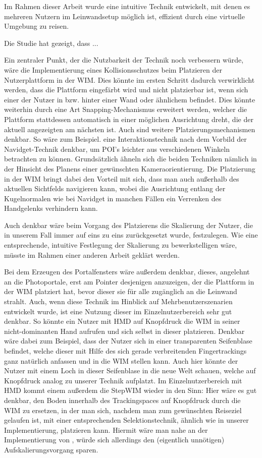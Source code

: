 Im Rahmen dieser Arbeit wurde eine intuitive Technik entwickelt, mit denen es mehreren Nutzern im Leinwandsetup möglich ist, effizient durch eine virtuelle Umgebung zu reisen. 

Die Studie hat gezeigt, dass ...


Ein zentraler Punkt, der die Nutzbarkeit der Technik noch verbessern würde, wäre die Implementierung eines Kollisionsschutzes beim Platzieren der Nutzerplattform in der WIM. Dies könnte im ersten Schritt dadurch verwirklicht werden, dass die Plattform eingefärbt wird und nicht platzierbar ist, wenn sich einer der Nutzer in bzw. hinter einer Wand oder ähnlichem befindet. Dies könnte weiterhin durch eine Art \glqq Snapping\grqq{}-Mechanismus erweitert werden, welcher die Plattform stattdessen automatisch in einer möglichen Ausrichtung dreht, die der aktuell angezeigten am nächsten ist.
Auch sind weitere Platzierungsmechanismen denkbar. So wäre zum Beispiel. eine Interaktionstechnik nach dem Vorbild der Navidget-Technik \cite{HACHET2009225} denkbar, um POI's leichter aus verschiedenen Winkeln betrachten zu können. Grundsätzlich ähneln sich die beiden Techniken nämlich in der Hinsicht des Planens einer gewünschten Kameraorientierung. Die Platzierung in der WIM bringt dabei den Vorteil mit sich, dass man auch außerhalb des aktuellen Sichtfelds navigieren kann, wobei die Ausrichtung entlang der Kugelnormalen wie bei Navidget in manchen Fällen ein Verrenken des Handgelenks verhindern kann.

Auch denkbar wäre beim Vorgang des Platzierens die Skalierung der Nutzer, die in unserem Fall immer auf eins zu eins zurückgesetzt wurde, festzulegen. Wie eine entsprechende, intuitive Festlegung der Skalierung zu bewerkstelligen wäre, müsste im Rahmen einer anderen Arbeit geklärt werden.

Bei dem Erzeugen des Portalfensters wäre außerdem denkbar, dieses, angelehnt an die Photoportale, erst am Pointer desjenigen anzuzeigen, der die Plattform in der WIM platziert hat, bevor dieser sie für alle zugänglich an die Leinwand strahlt.
Auch, wenn diese Technik im Hinblick auf Mehrbenutzerszenarien entwickelt wurde, ist eine Nutzung dieser im Einzelnutzerbereich sehr gut denkbar. So könnte ein Nutzer mit HMD auf Knopfdruck die WIM in seiner nicht-dominanten Hand aufrufen und sich selbst in dieser platzieren. Denkbar wäre dabei zum Beispiel, dass der Nutzer sich in einer transparenten \glqq Seifenblase\grqq{} befindet, welche dieser mit Hilfe des sich gerade verbreitenden Fingertrackings ganz natürlich anfassen und in die WIM stellen kann. Auch hier könnte der Nutzer mit einem Loch in dieser \glqq Seifenblase\grqq{} in die neue Welt schauen, welche auf Knopfdruck analog zu unserer Technik \glqq aufplatzt\grqq{}. Im Einzelnutzerbereich mit HMD kommt einem außerdem die StepWIM\cite{Stoakley2010VirtualWIM} wieder in den Sinn:
Hier wäre es gut denkbar, den Boden innerhalb des Trackingspaces auf Knopfdruck durch die WIM zu ersetzen, in der man sich, nachdem man zum gewünschten Reiseziel gelaufen ist, mit einer entsprechenden Selektionstechnik, ähnlich wie in unserer Implementierung, platzieren kann.
Hiermit wäre man nahe an der Implementierung von \cite{Krekhov2018GulliVR}, würde sich allerdings den (eigentlich unnötigen) Aufskalierungsvorgang sparen.

